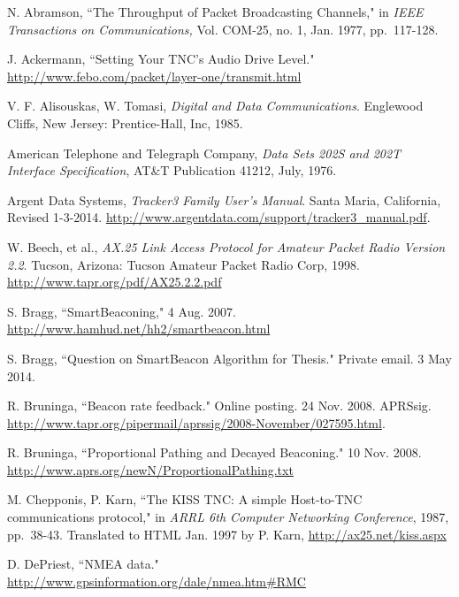 \begin{thebibliography}{99}


		N. Abramson,
		``The Throughput of Packet Broadcasting Channels," in
		\emph{IEEE Transactions on Communications,}
		Vol. COM-25, no. 1, Jan. 1977, pp.~117-128.

		J. Ackermann,
		``Setting Your TNC's Audio Drive Level."
		\url{http://www.febo.com/packet/layer-one/transmit.html}

		V. F. Alisouskas, W. Tomasi, 
		\emph{Digital and Data Communications}.
		Englewood Cliffs, New Jersey: Prentice-Hall, Inc, 1985.

		American Telephone and Telegraph Company,
		\emph{Data Sets 202S and 202T Interface Specification},
		AT\&T Publication 41212,
		July, 1976.

		Argent Data Systems,
		\emph{Tracker3 Family User's Manual}.
		Santa Maria, California,
		Revised 1-3-2014.
		\url{http://www.argentdata.com/support/tracker3_manual.pdf}.

		W. Beech, et al.,
		\emph{AX.25 Link Access Protocol for Amateur Packet Radio Version 2.2}.
		Tucson, Arizona: Tucson Amateur Packet Radio Corp, 1998. 
		\url{http://www.tapr.org/pdf/AX25.2.2.pdf}

		S. Bragg, 
		``SmartBeaconing\texttrademark,"
		4 Aug. 2007.
		\url{http://www.hamhud.net/hh2/smartbeacon.html}

		S. Bragg, ``Question on SmartBeacon Algorithm for Thesis."
		Private email. 3 May 2014.

		R. Bruninga,
		``Beacon rate feedback."
		Online posting. 24 Nov. 2008. APRSsig.
		\url{http://www.tapr.org/pipermail/aprssig/2008-November/027595.html}.

		R. Bruninga, ``Proportional Pathing and Decayed Beaconing."
		10 Nov. 2008.
		\url{http://www.aprs.org/newN/ProportionalPathing.txt}

		M. Chepponis, P. Karn,
		``The KISS TNC: A simple Host-to-TNC communications protocol,"
		in \emph{ARRL 6th Computer Networking Conference},
		1987, pp.~38-43.
		Translated to HTML Jan. 1997 by P. Karn,
		\url{http://ax25.net/kiss.aspx}

		D. DePriest,
		``NMEA data."
		\url{http://www.gpsinformation.org/dale/nmea.htm#RMC}


\end{thebibliography}
